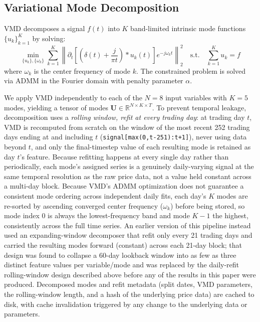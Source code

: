 \documentclass[journal]{IEEEtran}
\begin{document}
\subsection{Variational Mode Decomposition}

VMD \citep{Dragomiretskiy2014} decomposes a signal $f(t)$ into $K$ band-limited intrinsic mode functions $\{u_k\}_{k=1}^{K}$ by solving:
\begin{equation}
\min_{\{u_k\}, \{\omega_k\}} \sum_{k=1}^{K} \left\| \partial_t \left[ \left(\delta(t) + \frac{j}{\pi t}\right) * u_k(t) \right] e^{-j\omega_k t} \right\|_2^2 \quad \text{s.t.} \quad \sum_{k=1}^{K} u_k = f
\end{equation}
where $\omega_k$ is the center frequency of mode $k$. The constrained problem is solved via ADMM in the Fourier domain with penalty parameter $\alpha$.

We apply VMD independently to each of the $N=8$ input variables with $K=5$ modes, yielding a tensor of modes $\mathbf{U} \in \mathbb{R}^{N \times K \times T}$. To prevent temporal leakage, decomposition uses a \emph{rolling window, refit at every trading day}: at trading day $t$, VMD is recomputed from scratch on the window of the most recent 252 trading days ending at and including $t$ (\texttt{signal[max(0,t-251):t+1]}), never using data beyond $t$, and only the final-timestep value of each resulting mode is retained as day $t$'s feature. Because refitting happens at every single day rather than periodically, each mode's assigned series is a genuinely daily-varying signal at the same temporal resolution as the raw price data, not a value held constant across a multi-day block. Because VMD's ADMM optimization does not guarantee a consistent mode ordering across independent daily fits, each day's $K$ modes are re-sorted by ascending converged center frequency ($\omega_k$) before being stored, so mode index 0 is always the lowest-frequency band and mode $K-1$ the highest, consistently across the full time series. An earlier version of this pipeline instead used an expanding-window decomposer that refit only every 21 trading days and carried the resulting modes forward (constant) across each 21-day block; that design was found to collapse a 60-day lookback window into as few as three distinct feature values per variable/mode and was replaced by the daily-refit rolling-window design described above before any of the results in this paper were produced. Decomposed modes and refit metadata (split dates, VMD parameters, the rolling-window length, and a hash of the underlying price data) are cached to disk, with cache invalidation triggered by any change to the underlying data or parameters.
\end{document}
